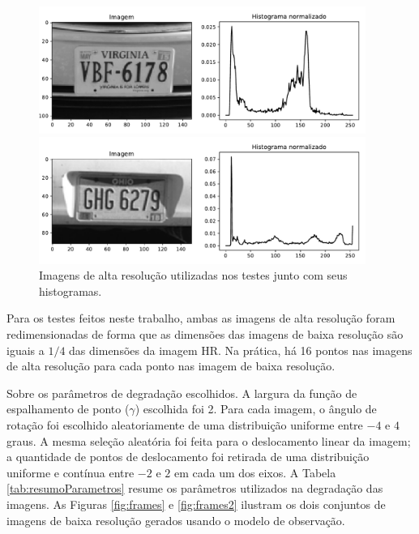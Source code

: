 \begin{figure}[h]
	\centering
	\caption{Imagens de alta resolução utilizadas nos testes junto com seus histogramas.}
	\label{fig:hrimage}
	\begin{minipage}[b]{\linewidth}
		\centering
		\includegraphics[width=0.95\textwidth]{figures/imtestes.pdf}
	\end{minipage}

	\begin{minipage}[b]{\linewidth}
		\centering
		\includegraphics[width=0.95\textwidth]{figures/imteste2s.pdf}
	\end{minipage}

\end{figure}

Para os testes feitos neste trabalho, ambas as imagens de alta resolução foram
redimensionadas de forma que as dimensões das imagens de baixa resolução são iguais a
$1/4$ das dimensões da imagem HR.  
Na prática, há 16 pontos nas imagens de alta resolução para cada ponto nas imagem de
baixa resolução.

Sobre os parâmetros de degradação escolhidos. A largura da função de espalhamento de ponto ($\gamma$) escolhida foi 2.
Para cada imagem, o ângulo de rotação foi escolhido aleatoriamente de uma distribuição uniforme entre $-4$ e $4$ graus.
A mesma seleção aleatória foi feita para o deslocamento linear da imagem; a quantidade de pontos de deslocamento foi retirada de uma distribuição uniforme e contínua entre $-2$ e $2$ em cada um dos eixos.
A Tabela \ref{tab:resumoParametros} resume os parâmetros utilizados na degradação das imagens.
As Figuras \ref{fig:frames} e \ref{fig:frames2} ilustram os dois conjuntos de imagens de baixa resolução gerados usando o modelo de observação.

